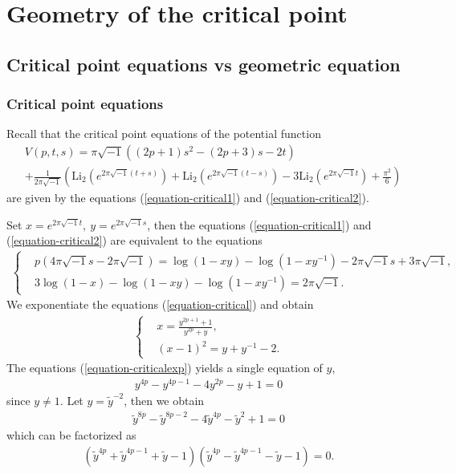 \documentclass[12pt]{amsart}
\begin{document}
\section{Geometry of the critical point} \label{Section-geometry}

\subsection{Critical point equations vs geometric equation}
\subsubsection{Critical point equations}
Recall that the critical point equations of the potential function 
\begin{align}      
&V(p,t,s)=\pi \sqrt{-1}\left((2 p+1)s^2-(2 p+3)s-2 t\right)\\\nonumber      
&+\frac{1}{2\pi\sqrt{-1}}\left(\text{Li}_2(e^{2\pi\sqrt{-1}(t+s)})+\text{Li}_2(e^{2\pi\sqrt{-1}(t-s)})-3\text{Li}_2(e^{2\pi\sqrt{-1}t})+\frac{\pi^2}{6}\right)
\end{align}
are given by 
the equations (\ref{equation-critical1}) and (\ref{equation-critical2}). 


Set $x=e^{2\pi\sqrt{-1}t},\ y=e^{2\pi\sqrt{-1}s}$, then the equations (\ref{equation-critical1}) and (\ref{equation-critical2}) are equivalent to the equations
\begin{align}
\left\{\begin{aligned} \label{equation-critical}   
   & p(4\pi \sqrt{-1}s-2\pi\sqrt{-1})=\log\left(1-xy\right)-\log\left({1-xy^{-1}}\right)-2\pi\sqrt{-1}s+3\pi\sqrt{-1} , \\
   &3\log(1-x)-\log(1-xy)-\log(1-xy^{-1})=2\pi\sqrt{-1}.
    \end{aligned}\right.
\end{align}
We exponentiate the equations (\ref{equation-critical}) and obtain
\begin{align} \label{equation-criticalexp}
 \left\{ \begin{aligned}
     &x=\frac{y^{2p+1}+1}{y^{2p}+y}, \\
      &(x-1)^2=y+y^{-1}-2.
                          \end{aligned} \right.   
\end{align}
 The  equations (\ref{equation-criticalexp}) yields a single equation of $y$,  
\begin{align} \label{equation-singley}
 y^{4p}-y^{4p-1}-4y^{2p}-y+1=0
\end{align}
since $y\neq 1$. Let $y=\tilde{y}^{-2}$, then we obtain 
\begin{align}
\tilde{y}^{8p}-\tilde{y}^{8p-2}-4\tilde{y}^{4p}-\tilde{y}^{2}+1=0    
\end{align}
which can be factorized as 
\begin{align}
 (\tilde{y}^{4p}+\tilde{y}^{4p-1}+\tilde{y}-1)(\tilde{y}^{4p}-\tilde{y}^{4p-1}-\tilde{y}-1)=0.     
\end{align}
\end{document}
